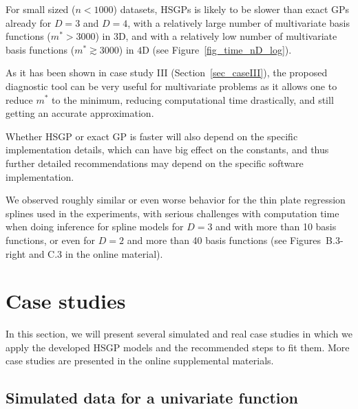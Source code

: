 For small sized ($n<1000$) datasets, HSGPs is likely to be slower than exact GPs already for $D=3$ and $D=4$, with a relatively large number of multivariate basis functions ($m^* > 3000$) in $3$D, and with a relatively low number of multivariate basis functions ($m^* \gtrsim 3000$) in $4$D (see Figure~\ref{fig_time_nD_log}). 


As it has been shown in case study III (Section~\ref{sec_caseIII}), the proposed diagnostic tool can be very useful for multivariate problems as it allows one to reduce $m^*$ to the minimum, reducing computational time drastically, and still getting an accurate approximation.%

Whether HSGP or exact GP is faster will also depend on the specific implementation details, which can have big effect on the constants, and thus further detailed recommendations may depend on the specific software implementation.

We observed roughly similar or even worse behavior for the thin plate regression splines used in the experiments, with serious challenges with computation time when doing inference for spline models for $D=3$ and with more than 10 basis functions, or even for $D=2$ and more than 40 basis functions (see Figures~B.3-right and C.3 in the online material).

\section{Case studies}\label{sec_cases}

In this section, we will present several simulated and real case studies in which we apply the developed HSGP models and the recommended steps to fit them. More case studies are presented in the online supplemental materials.

\subsection{Simulated data for a univariate function}\label{sec_univariate_simu}

